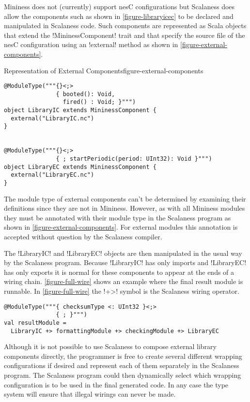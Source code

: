 Mininess does not (currently) support nesC configurations but Scalaness does allow the
components such as shown in \autoref{figure-libraryicec} to be declared and manipulated in
Scalaness code. Such components are represented as Scala objects that extend the
!MininessComponent! trait and that specify the source file of the nesC configuration using an
!external! method as shown in \autoref{figure-external-components}.

\singlespace
\begin{fpfig}[tbhp]{Representation of External Components}{figure-external-components}
{
\begin{lstlisting}[language=scalaness]
@ModuleType("""{}<;>
               { booted(): Void,
                 fired() : Void; }""")
object LibraryIC extends MininessComponent {
  external("LibraryIC.nc")
}


@ModuleType("""{}<;>
               { ; startPeriodic(period: UInt32): Void }""")
object LibraryEC extends MininessComponent {
  external("LibraryEC.nc")
}
\end{lstlisting}
}
\end{fpfig}
\primaryspacing

The module type of external components can't be determined by examining their definitions since
they are not in Mininess. However, as with all Mininess modules they must be annotated with
their module type in the Scalaness program as shown in \autoref{figure-external-components}. For
external modules this annotation is accepted without question by the Scalaness compiler.

The !LibraryIC! and !LibraryEC! objects are then manipulated in the usual way by the Scalaness
program. Because !LibraryIC! has only imports and !LibraryEC! has only exports it is normal for
these components to appear at the ends of a wiring chain. \autoref{figure-full-wire} shows an
example where the final result module is runnable. In \autoref{figure-full-wire} the !+>!
symbol is the Scalaness wiring operator.

\singlespace
\vspace{1.0ex}
\begin{lstlisting}[language=scalaness]
@ModuleType("""{ checksumType <: UInt32 }<;>
               { ; }""")
val resultModule =
  LibraryIC +> formattingModule +> checkingModule +> LibraryEC
\end{lstlisting}
\vspace{1.0ex}
\primaryspacing

Although it is not possible to use Scalaness to compose external library components directly,
the programmer is free to create several different wrapping configurations if desired and
represent each of them separately in the Scalaness program. The Scalaness program could then
dynamically select which wrapping configuration is to be used in the final generated code. In
any case the type system will ensure that illegal wirings can never be made.

